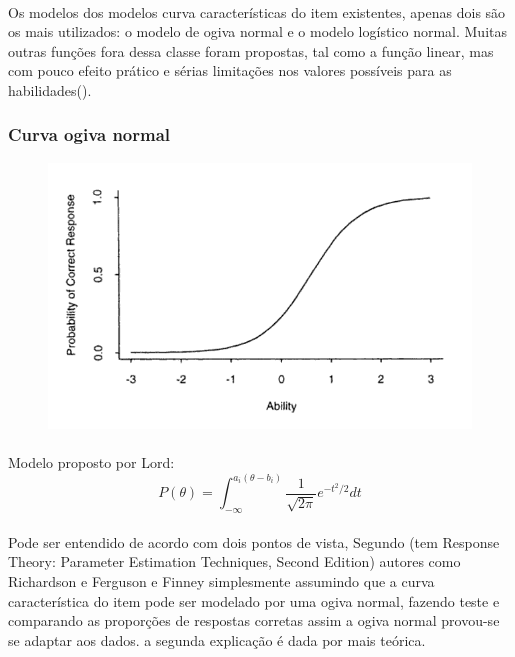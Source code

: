     \paragraph{}
    
    
    
        Os modelos dos modelos  curva características do item existentes, apenas dois são os mais utilizados: o modelo de ogiva normal e o modelo logístico normal. Muitas outras funções fora dessa classe foram propostas, tal como a função linear, mas com pouco efeito prático e sérias limitações nos valores possíveis para as habilidades(\cite{Ribeiro}).
    \subsubsection{Curva ogiva normal}
    \begin{figure}[!h]
    	\centering
    	\includegraphics[width=0.6\linewidth]{img/ogiva}
    	\caption{}
    	\label{fig:ogiva}
    \end{figure}
    \paragraph{}
        Modelo proposto por Lord:
    \begin{equation}
        P(\theta) = \displaystyle\int_{-\infty}^{a_i(\theta - b_i)}\displaystyle\frac{1}{\sqrt{2\pi}}e^{-t^2/2}dt
    \end{equation}
    \paragraph{}
        Pode ser entendido de acordo com dois pontos de vista, Segundo (tem Response Theory: Parameter Estimation Techniques, Second Edition) autores como Richardson e Ferguson e Finney  simplesmente assumindo que a curva característica do item pode ser modelado por uma ogiva normal, fazendo teste e comparando as proporções de respostas corretas assim a ogiva normal provou-se se adaptar aos dados. a segunda explicação é dada por \cite{Novick} mais teórica.
        
